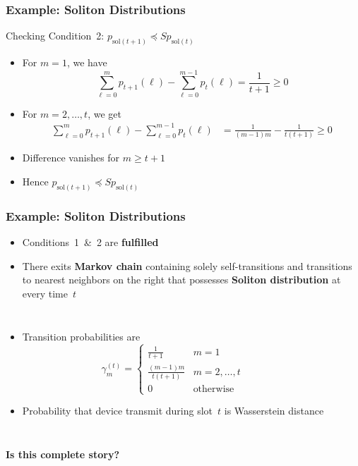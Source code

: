 \documentclass[10pt]{beamer}
\begin{document}
\begin{frame}
\frametitle{Example: Soliton Distributions}
\begin{block}{Checking Condition~2: $p_{\mathrm{sol}(t+1)} \preceq S p_{\mathrm{sol}(t)}$}
\begin{itemize}
\item For $m=1$, we have
\begin{equation*}
\sum_{\ell=0}^m p_{t+1}(\ell)
- \sum_{\ell=0}^{m-1} p_t(\ell)
= \frac{1}{t+1} \geq 0
\end{equation*}
\item For $m = 2, \ldots, t$, we get
\begin{equation*}
\begin{split}
\sum_{\ell=0}^m p_{t+1}(\ell)
- \sum_{\ell=0}^{m-1} p_t(\ell)
&= \frac{1}{(m-1)m} - \frac{1}{t(t+1)} \geq 0
\end{split}
\end{equation*}
\item Difference vanishes for $m \geq t+1$
\item Hence $p_{\mathrm{sol}(t+1)} \preceq S p_{\mathrm{sol}(t)}$
\end{itemize}
\end{block}
\end{frame}


\begin{frame}
\frametitle{Example: Soliton Distributions}
\begin{itemize}
\item Conditions~1~\&~2 are \textbf{fulfilled}
\item There exits \textbf{Markov chain} containing solely self-transitions and transitions to nearest neighbors on the right that possesses \textbf{Soliton distribution} at every time~$t$
\end{itemize}
\vfill
\begin{columns}
  \begin{itemize}
  \item Transition probabilities are
  \begin{equation*}
  \gamma^{(t)}_m = \begin{cases}
  \frac{1}{t+1} & m = 1 \\
  \frac{(m-1)m}{t(t+1)} & m = 2, \ldots, t \\
  0 & \text{otherwise}
  \end{cases}
  \end{equation*}
  \item Probability that device transmit during slot~$t$ is Wasserstein distance
  \end{itemize}
  \begin{center}
  \scalebox{0.9}{}
  \end{center}
\end{columns}
\vfill
\begin{center}
\textbf{Is this complete story?}
\end{center}
\end{frame}
\end{document}

